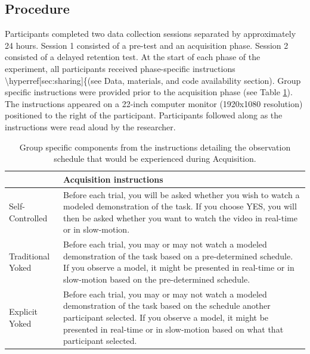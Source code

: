 \documentclass[
  english,
  man, donotrepeattitle,floatsintext]{apa7}
\begin{document}
\hypertarget{procedure}{%
\subsection{Procedure}\label{procedure}}

Participants completed two data collection sessions separated by approximately 24 hours. Session 1 consisted of a pre-test and an acquisition phase. Session 2 consisted of a delayed retention test. At the start of each phase of the experiment, all participants received phase-specific instructions \textbackslash hyperref{[}sec:sharing{]}\{(see Data, materials, and code availability section). Group specific instructions were provided prior to the acquisition phase (see Table \ref{tab:table1}). The instructions appeared on a 22-inch computer monitor (1920x1080 resolution) positioned to the right of the participant. Participants followed along as the instructions were read aloud by the researcher. \medskip

\begin{table}

\caption{\label{tab:table1}Group specific components from the instructions detailing the observation schedule that would be experienced during Acquisition.}
\fontsize{11}{13}\selectfont
\begin{tabular}[t]{>{\raggedright\arraybackslash}p{8em}>{\raggedright\arraybackslash}p{33em}}
\toprule
  & Acquisition instructions\\
\midrule
Self-Controlled & Before each trial, you will be asked whether you wish to watch a modeled demonstration of the task. If you choose YES, you will then be asked whether you want to watch the video in real-time or in slow-motion.\\
\addlinespace
Traditional Yoked & Before each trial, you may or may not watch a modeled demonstration of the task based on a pre-determined schedule. If you observe a model, it might be presented in real-time or in slow-motion based on the pre-determined schedule.\\
\addlinespace
Explicit Yoked & Before each trial, you may or may not watch a modeled demonstration of the task based on the schedule another participant selected. If you observe a model, it might be presented in real-time or in slow-motion based on what that participant selected.\\
\bottomrule
\end{tabular}
\end{table}
\end{document}

